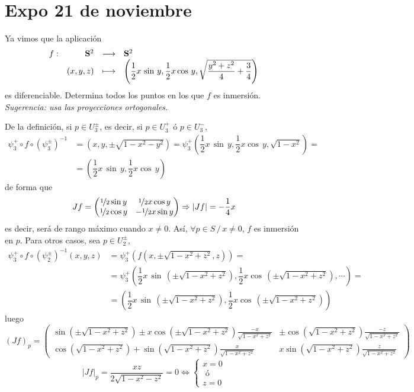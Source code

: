 \section{Expo 21 de noviembre}
\begin{ejer}
    [1] Ya vimos que la aplicaci\'on
    $$\begin{array}{rrcl}
         f : & \bold S^2 & \longrightarrow & \bold S^2  \\
         & (x,y,z) & \longmapsto & \left( \dfrac{1}{2} x\, \sin \, y, \dfrac{1}{2}x \cos \, y, \sqrt{\dfrac{y^2+z^2}{4}+\dfrac{3}{4}}\right) 
    \end{array}$$
    es diferenciable. Determina todos los puntos en los que $f$ es inmersi\'on. \textit{Sugerencia: usa las proyecciones ortogonales.}
\end{ejer}
\begin{sol}
    De la definici\'on, si $p \in U_3^{\pm}$, es decir, si $p \in U_3^+$ \'o $p \in U_3^-$, 
    \[ \begin{split} \psi_3^+ \circ f \circ (\psi_3^{\pm})^{-1} & = (x,y,\pm \sqrt{1-x^2-y^2}) = \psi_3^+ \left( \dfrac{1}{2} x\, \sin \, y, \dfrac{1}{2}x \cos \, y, \sqrt{1-x^2} \right) = \\ & =  \left( \dfrac{1}{2} x\, \sin \, y, \dfrac{1}{2}x \cos \, y \right) \end{split}\]
     de forma que 
    $$Jf = \begin{pmatrix}
        \nicefrac{1}{2} \sin y & \nicefrac{1}{2} x \cos y \\ \nicefrac{1}{2} \cos y & -\nicefrac{1}{2}x \sin y
    \end{pmatrix} \Rightarrow |Jf| = - \dfrac{1}{4} x$$
    es decir, ser\'a de rango m\'aximo cuando $x\neq 0$. As\'i, $\forall p\in S \, / \,  x\neq 0$, $f$ es inmersi\'on en $p$. Para otros casos, sea $p \in U_2^{\pm}$,
    \[ \begin{split}
        \psi_3^+ \circ f \circ (\psi_2^{\pm})^{-1}(x,y,z) & = \psi_3^+ \left( f (x,\pm \sqrt{1-x^2+z^2}, z)\right) = \\ & = \psi_3^+ \left( \dfrac{1}{2} x\, \sin \, \left(\pm \sqrt{1-x^2+z^2}\right), \dfrac{1}{2}x \cos \, \left(\pm \sqrt{1-x^2+z^2}\right), \cdots \right) = \\ & = \left( \dfrac{1}{2} x\, \sin \, \left(\pm \sqrt{1-x^2+z^2}\right), \dfrac{1}{2}x \cos \, \left(\pm \sqrt{1-x^2+z^2}\right) \right)
    \end{split} \]
    luego 
    $$(Jf)_p=\begin{pmatrix}
        \sin \left(\pm \sqrt{1-x^2+z^2}\right) \pm x \cos \left(\pm \sqrt{1-x^2+z^2}\right) \frac{-x}{\sqrt{1-x^2+z^2}} & \pm \cos \left(\sqrt{1-x^2+z^2}\right) \frac{-z}{\sqrt{1-x^2+z^2}} \\ 
        \cos\left( \sqrt{1-x^2+z^2}\right) + \sin \left(\sqrt{1-x^2+z^2}\right) \frac{x}{\sqrt{1-x^2+z^2}} & x \sin \left(\sqrt{1-x^2+z^2}\right) \frac{z}{\sqrt{1-x^2+z^2}}
    \end{pmatrix}$$
    $$|Jf|_p = \dfrac{xz}{2 \sqrt{1-x^2-z^2}} = 0 \iff \begin{cases}
        x = 0 \\ \text{ \'o } \\ z=0
    \end{cases}$$


\end{sol}
